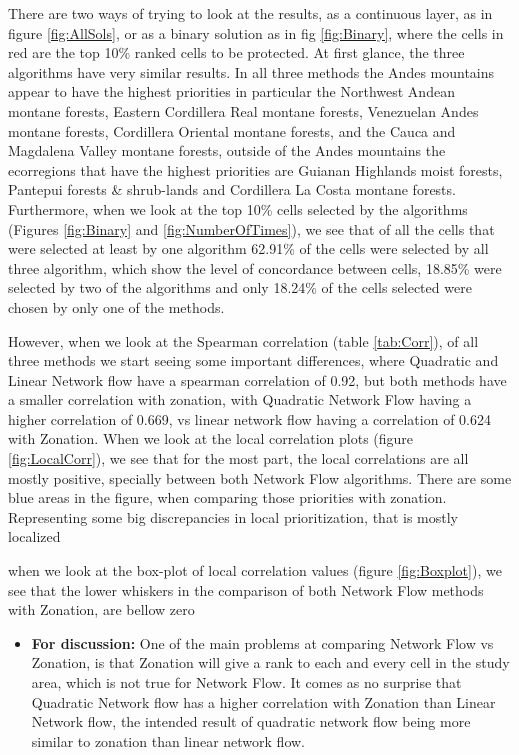 \documentclass[]{article}
\providecommand{\tightlist}{%
  \setlength{\itemsep}{0pt}\setlength{\parskip}{0pt}}
\begin{document}
There are two ways of trying to look at the results, as a continuous layer, as in figure \ref{fig:AllSols}, or as a binary solution as in fig \ref{fig:Binary}, where the cells in red are the top 10\% ranked cells to be protected. At first glance, the three algorithms have very similar results. In all three methods the Andes mountains appear to have the highest priorities in particular the Northwest Andean montane forests, Eastern Cordillera Real montane forests, Venezuelan Andes montane forests, Cordillera Oriental montane forests, and the Cauca and Magdalena Valley montane forests, outside of the Andes mountains the ecorregions that have the highest priorities are Guianan Highlands moist forests, Pantepui forests \& shrub-lands and Cordillera La Costa montane forests. Furthermore, when we look at the top 10\% cells selected by the algorithms (Figures \ref{fig:Binary} and \ref{fig:NumberOfTimes}), we see that of all the cells that were selected at least by one algorithm 62.91\% of the cells were selected by all three algorithm, which show the level of concordance between cells, 18.85\% were selected by two of the algorithms and only 18.24\% of the cells selected were chosen by only one of the methods.

However, when we look at the Spearman correlation (table \ref{tab:Corr}), of all three methods we start seeing some important differences, where Quadratic and Linear Network flow have a spearman correlation of 0.92, but both methods have a smaller correlation with zonation, with Quadratic Network Flow having a higher correlation of 0.669, vs linear network flow having a correlation of 0.624 with Zonation. When we look at the local correlation plots (figure \ref{fig:LocalCorr}), we see that for the most part, the local correlations are all mostly positive, specially between both Network Flow algorithms. There are some blue areas in the figure, when comparing those priorities with zonation. Representing some big discrepancies in local prioritization, that is mostly localized

when we look at the box-plot of local correlation values (figure \ref{fig:Boxplot}), we see that the lower whiskers in the comparison of both Network Flow methods with Zonation, are bellow zero

\begin{itemize}
\tightlist
\item
  \textbf{For discussion:} One of the main problems at comparing Network Flow vs Zonation, is that Zonation will give a rank to each and every cell in the study area, which is not true for Network Flow. It comes as no surprise that Quadratic Network flow has a higher correlation with Zonation than Linear Network flow, the intended result of quadratic network flow being more similar to zonation than linear network flow.
\end{itemize}
\end{document}
